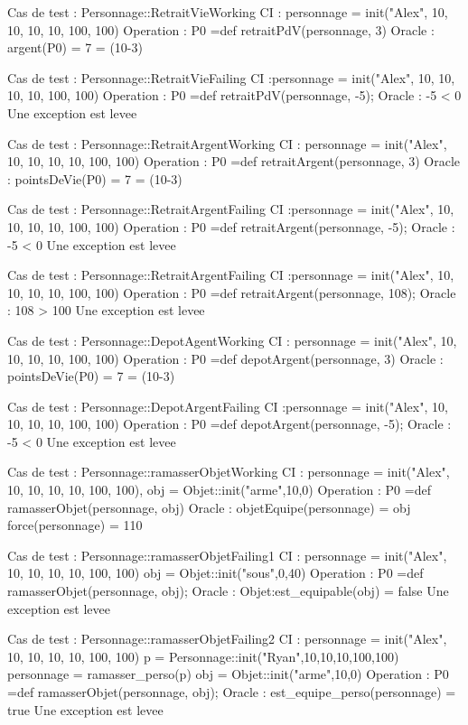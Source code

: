 \documentclass[a4paper, 11pt, notitlepage]{report}
\begin{document}
\begin{Test}
Cas de test : Personnage::RetraitVieWorking
CI : personnage = init("Alex", 10, 10, 10, 10, 100, 100)
Operation : P0 =def retraitPdV(personnage, 3)
Oracle :
	argent(P0) = 7 = (10-3)

Cas de test : Personnage::RetraitVieFailing
CI :personnage = init("Alex", 10, 10, 10, 10, 100, 100)
Operation : P0 =def retraitPdV(personnage, -5);
Oracle : 
	-5 < 0
	Une exception est levee
	
	
	Cas de test : Personnage::RetraitArgentWorking
CI : personnage = init("Alex", 10, 10, 10, 10, 100, 100)
Operation : P0 =def retraitArgent(personnage, 3)
Oracle :
	pointsDeVie(P0) = 7 = (10-3)

Cas de test : Personnage::RetraitArgentFailing
CI :personnage = init("Alex", 10, 10, 10, 10, 100, 100)
Operation : P0 =def retraitArgent(personnage, -5);
Oracle : 
	-5 < 0
	Une exception est levee
	
Cas de test : Personnage::RetraitArgentFailing
CI :personnage = init("Alex", 10, 10, 10, 10, 100, 100)
Operation : P0 =def retraitArgent(personnage, 108);
Oracle : 
	108 > 100
	Une exception est levee
	
Cas de test : Personnage::DepotAgentWorking
CI : personnage = init("Alex", 10, 10, 10, 10, 100, 100)
Operation : P0 =def depotArgent(personnage, 3)
Oracle :
	pointsDeVie(P0) = 7 = (10-3)

Cas de test : Personnage::DepotArgentFailing
CI :personnage = init("Alex", 10, 10, 10, 10, 100, 100)
Operation : P0 =def depotArgent(personnage, -5);
Oracle : 
	-5 < 0
	Une exception est levee
	
Cas de test : Personnage::ramasserObjetWorking
CI : personnage = init("Alex", 10, 10, 10, 10, 100, 100),
		 obj = Objet::init("arme",10,0)
Operation : P0 =def ramasserObjet(personnage, obj)
Oracle :
	objetEquipe(personnage) = obj
	force(personnage) = 110

Cas de test : Personnage::ramasserObjetFailing1
CI :	personnage = init("Alex", 10, 10, 10, 10, 100, 100)
			obj = Objet::init("sous",0,40)
Operation : P0 =def ramasserObjet(personnage, obj);
Oracle : 
	Objet:est_equipable(obj) = false
	Une exception est levee

Cas de test : Personnage::ramasserObjetFailing2
CI :	personnage = init("Alex", 10, 10, 10, 10, 100, 100)
			p = Personnage::init("Ryan",10,10,10,100,100)
			personnage = ramasser_perso(p)
			obj = Objet::init("arme",10,0)
Operation : P0 =def ramasserObjet(personnage, obj);
Oracle : 
	est_equipe_perso(personnage) = true
	Une exception est levee
	

\end{Test}
\end{document}
